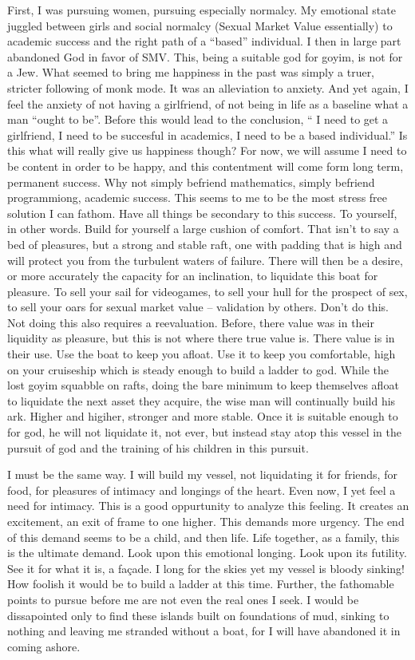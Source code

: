 \qquad First, I was pursuing women, pursuing especially normalcy. My
emotional state juggled between girls and social normalcy (Sexual Market
Value essentially) to academic success and the right path of a ``based''
individual. I then in large part abandoned God in favor of SMV. This,
being a suitable god for goyim, is not for a Jew. What seemed to bring
me happiness in the past was simply a truer, stricter following of monk
mode. It was an alleviation to anxiety. And yet again, I feel the
anxiety of not having a girlfriend, of not being in life as a baseline
what a man ``ought to be''. Before this would lead to the conclusion, ``
I need to get a girlfriend, I need to be succesful in academics, I need
to be a based individual.'' Is this what will really give us happiness
though? For now, we will assume I need to be content in order to be
happy, and this contentment will come form long term, permanent success.
Why not simply befriend mathematics, simply befriend programmiong,
academic success. This seems to me to be the most stress free solution I
can fathom. Have all things be secondary to this success. To yourself,
in other words. Build for yourself a large cushion of comfort. That
isn't to say a bed of pleasures, but a strong and stable raft, one with
padding that is high and will protect you from the turbulent waters of
failure. There will then be a desire, or more accurately the capacity
for an inclination, to liquidate this boat for pleasure. To sell your
sail for videogames, to sell your hull for the prospect of sex, to sell
your oars for sexual market value -- validation by others. Don't do
this. Not doing this also requires a reevaluation. Before, there value
was in their liquidity as pleasure, but this is not where there true
value is. There value is in their use. Use the boat to keep you afloat.
Use it to keep you comfortable, high on your cruiseship which is steady
enough to build a ladder to god. While the lost goyim squabble on rafts,
doing the bare minimum to keep themselves afloat to liquidate the next
asset they acquire, the wise man will continually build his ark. Higher
and higiher, stronger and more stable. Once it is suitable enough to for
god, he will not liquidate it, not ever, but instead stay atop this
vessel in the pursuit of god and the training of his children in this
pursuit.

\qquad I must be the same way. I will build my vessel, not liquidating
it for friends, for food, for pleasures of intimacy and longings of the
heart. Even now, I yet feel a need for intimacy. This is a good
oppurtunity to analyze this feeling. It creates an excitement, an exit
of frame to one higher. This demands more urgency. The end of this
demand seems to be a child, and then life. Life together, as a family,
this is the ultimate demand. Look upon this emotional longing. Look upon
its futility. See it for what it is, a façade. I long for the skies yet
my vessel is bloody sinking! How foolish it would be to build a ladder
at this time. Further, the fathomable points to pursue before me are not
even the real ones I seek. I would be dissapointed only to find these
islands built on foundations of mud, sinking to nothing and leaving me
stranded without a boat, for I will have abandoned it in coming ashore.

